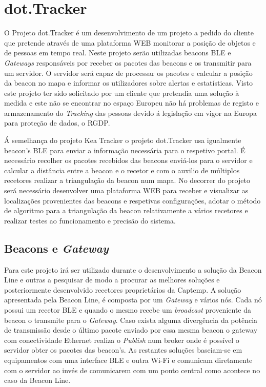\section{dot.Tracker} \label{dot.tracker}


\par O Projeto dot.Tracker é um desenvolvimento de um projeto a pedido do cliente que pretende através de uma plataforma WEB monitorar a posição de objetos e de pessoas em tempo real. Neste projeto serão utilizadas beacons BLE e \textit{Gateways} responsáveis por receber os pacotes das beacons e os transmitir para um servidor. O servidor será capaz de processar os pacotes e calcular a posição da beacon no mapa e informar os utilizadores sobre alertas e estatísticas. Visto este projeto ter sido solicitado por um cliente que pretendia uma solução à medida e este não se encontrar no espaço Europeu não há problemas de registo e armazenamento do \textit{Tracking} das pessoas devido á legislação em vigor na Europa para proteção de dados, o RGDP.

Á semelhança do projeto Kea Tracker o projeto dot.Tracker usa igualmente beacon's BLE para enviar a informação necessária para o respetivo portal. É necessário recolher os pacotes recebidos das beacons enviá-los para o servidor e calcular a distância entre a beacon e o recetor e com o auxilio de múltiplos recetores realizar a triangulação da beacon num mapa. No decorrer do projeto será necessário desenvolver uma plataforma WEB para receber e visualizar as localizações provenientes das beacons e respetivas configurações, adotar o método de algoritmo para a triangulação da beacon relativamente a vários recetores e realizar testes ao funcionamento e precisão do sistema.
\subsection{Beacons e \textit{Gateway}}
Para este projeto irá ser utilizado durante o desenvolvimento a solução da Beacon Line\cite{taskit} e outras a pesquisar de modo a procurar as melhores soluções e posteriormente desenvolvido recetores proprietários da Captemp. A solução apresentada pela Beacon Line, é composta por um \textit{Gateway} e vários nós. Cada nó possui um recetor BLE e quando o mesmo recebe um \textit{broadcast} proveniente da beacon o transmite para o \textit{Gateway}. Caso exista alguma divergência da potência de transmissão desde o último pacote enviado por essa mesma beacon o gateway com conectividade Ethernet realiza o \textit{Publish} num broker onde é possível o servidor obter os pacotes das beacon's. As restantes soluções baseiam-se em equipamentos com uma interface BLE e outra Wi-Fi e comunicam diretamente com o servidor ao invés de comunicarem com um ponto central como acontece no caso da Beacon Line.


